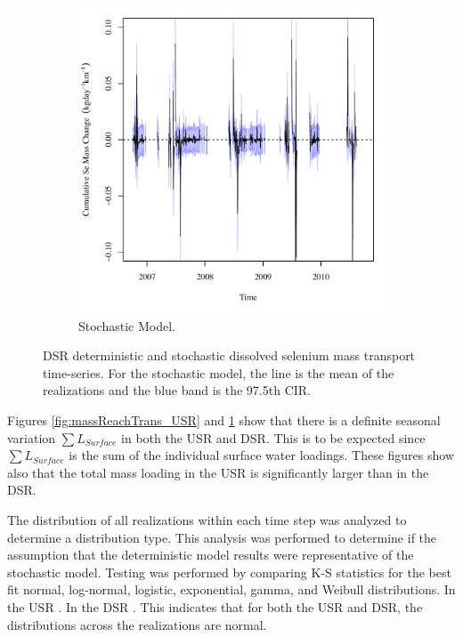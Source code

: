 \begin{linenumbers}
\begin{landscape}
\begin{figure}
\begin{subfigure}{0.7\textwidth}
			\includegraphics[width=\tableCustomSize]{"Figures/Results_DSR/Stochastic/Balance Mass - Storage"}
			\caption{Stochastic Model.}
		\end{subfigure}
		\caption[DSR deterministic and stochastic dissolved selenium mass transport time-series.]{DSR deterministic and stochastic dissolved selenium mass transport time-series.  For the stochastic model, the line is the mean of the realizations and the blue band is the 97.5th CIR.}
		\label{fig:massReachTrans_DSR}
	\end{figure}
\end{landscape}

Figures \ref{fig:massReachTrans_USR} and \ref{fig:massReachTrans_DSR} show that there is a definite seasonal variation $ \sum L_{Surface} $ in both the USR and DSR.  This is to be expected since $ \sum L_{Surface} $ is the sum of the individual surface water loadings.  These figures show also that the total mass loading in the USR is significantly larger than in the DSR.

The distribution of all realizations within each time step was analyzed to determine a distribution type.  This analysis was performed to determine if the assumption that the deterministic model results were representative of the stochastic model.  Testing was performed by comparing K-S statistics for the best fit normal, log-normal, logistic, exponential, gamma, and Weibull distributions.  In the USR .  In the DSR .  This indicates that for both the USR and DSR, the distributions across the realizations are normal. 


\end{linenumbers}
